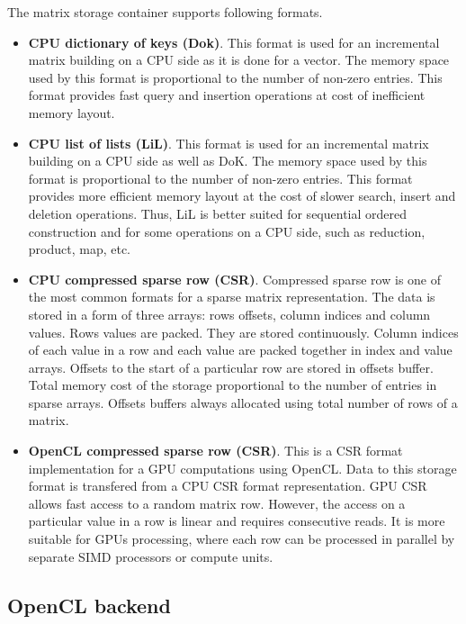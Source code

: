 The matrix storage container supports following formats.

\begin{itemize}
    \item \textbf{CPU dictionary of keys (Dok)}. This format is used for an incremental matrix building on a CPU side as it is done for a vector. The memory space used by this format is proportional to the number of non-zero entries. This format provides fast query and insertion operations at cost of inefficient memory layout.

    \item \textbf{CPU list of lists (LiL)}. This format is used for an incremental matrix building on a CPU side as well as DoK. The memory space used by this format is proportional to the number of non-zero entries. This format provides more efficient memory layout at the cost of slower search, insert and deletion operations. Thus, LiL is better suited for sequential ordered construction and for some operations on a CPU side, such as reduction, product, map, etc.
    
    \item \textbf{CPU compressed sparse row (CSR)}. Compressed sparse row is one of the most common formats for a sparse matrix representation. The data is stored in a form of three arrays: rows offsets, column indices and column values. Rows values are packed. They are stored continuously. Column indices of each value in a row and each value are packed together in index and value arrays. Offsets to the start of a particular row are stored in offsets buffer. Total memory cost of the storage proportional to the number of entries in sparse arrays. Offsets buffers always allocated using total number of rows of a matrix. 
    
    \item \textbf{OpenCL compressed sparse row (CSR)}. This is a CSR format implementation for a GPU computations using OpenCL. Data to this storage format is transfered from a CPU CSR format representation. GPU CSR allows fast access to a random matrix row. However, the access on a particular value in a row is linear and requires consecutive reads. It is more suitable for GPUs processing, where each row can be processed in parallel by separate SIMD processors or compute units.
\end{itemize}

\subsection{OpenCL backend}

